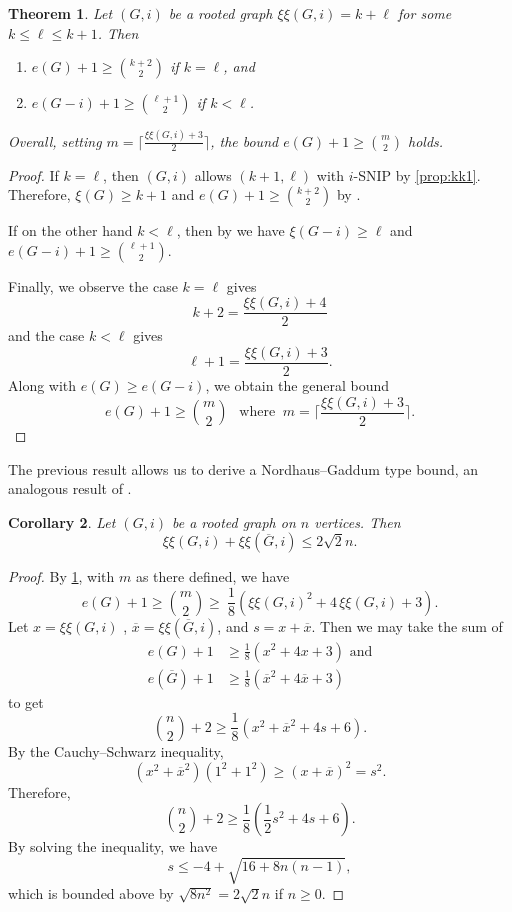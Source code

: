 \documentclass{article}
\newtheorem{theorem}{Theorem}[section]
\newtheorem{corollary}[theorem]{Corollary}
\theoremstyle{definition}
\newcommand{\excise}{\xi\xi}
\begin{document}
\begin{theorem}
\label{thm:edgebound}
Let $(G,i)$ be a rooted graph $\excise(G,i) = k + \ell$ for some $k \leq \ell \leq k+1$.  Then 
\begin{enumerate}[label={{\rm(\alph*)}}]
\item $e(G) + 1 \geq \binom{k+2}{2}$ if $k = \ell$, and 
\item $e(G - i) + 1 \geq \binom{\ell + 1}{2}$ if $k < \ell$.
\end{enumerate}
Overall,
setting
$m = \Big\lceil \frac{\excise(G,i) + 3}{2} \Big\rceil$, the bound $e(G) + 1 \geq \binom{m}{2}$ holds.
\end{theorem}
\begin{proof}
If $k = \ell$, then $(G,i)$ allows $(k+1, \ell)$ with $i$-SNIP by \cref{prop:kk1}.  Therefore, $\xi(G) \geq k+1$ and $e(G) + 1 \geq \binom{k+2}{2}$ by \cite[Theorem~3.9]{SNIP}.

If on the other hand $k < \ell$, then by \cite[Theorem~3.9]{SNIP} we have $\xi(G - i) \geq \ell$ and $e(G - i) + 1 \geq \binom{\ell + 1}{2}$.

Finally, we observe the case $k = \ell$ gives
\[
    k + 2 = \frac{\excise(G,i) + 4}{2}
\]
and the case $k < \ell$ gives
\[
    \ell + 1 = \frac{\excise(G,i) + 3}{2}.
\]
Along with $e(G) \geq e(G - i)$, we obtain the general bound
\[
    e(G) + 1 \geq \binom{m}{2}
    \ \ \mbox{ where }\  m = \bigg\lceil \frac{\excise(G,i) + 3}{2} \bigg\rceil.
\]
\end{proof}

The previous result allows us to derive a Nordhaus--Gaddum type bound, an analogous result of \cite[Section 3]{BFHH2013}.

\begin{corollary}
\label{cor:nhbound}
Let $(G,i)$ be a rooted graph on $n$ vertices. Then
\[
    \xi\xi(G,i) + \xi\xi(\overline{G},i)\leq 2\sqrt{2}n.
\]
\end{corollary}
\begin{proof}
By \cref{thm:edgebound}, with $m$ as there defined, we have 
\[
    e(G) + 1 \geq
    \binom{m}{2}
    \ge 
    \ \frac{1}{8}(\excise(G,i)^2 + 4\,\excise(G,i) + 3).
\]
Let $x = \excise(G,i)$ , $\overline{x} = \excise(\overline{G},i)$, and $s = x + \overline{x}$.  Then we may take the sum of 
\[
    \begin{aligned}
        e(G) + 1 &\geq \frac{1}{8}(x^2 + 4x + 3) \text{ and}\\
        e(\overline{G}) + 1 &\geq \frac{1}{8}(\overline{x}^2 + 4\overline{x} + 3)
    \end{aligned}
\]
to get 
\[
    \binom{n}{2} + 2 \geq \frac{1}{8}(x^2 + \overline{x}^2 + 4s + 6).
\]
By the Cauchy--Schwarz inequality, 
\[
    (x^2 + \overline{x}^2)(1^2 + 1^2) \geq (x + \overline{x})^2 = s^2.
\]
Therefore, 
\[
    \binom{n}{2} + 2 \geq \frac{1}{8}(\frac{1}{2}s^2 + 4s + 6).
\]
By solving the inequality, we have 
\[
    s \leq -4 + \sqrt{16 + 8n(n-1)},
\]
which is bounded above by $\sqrt{8n^2} = 2\sqrt{2}n$ if $n \geq 0$.  
\end{proof}
\end{document}

